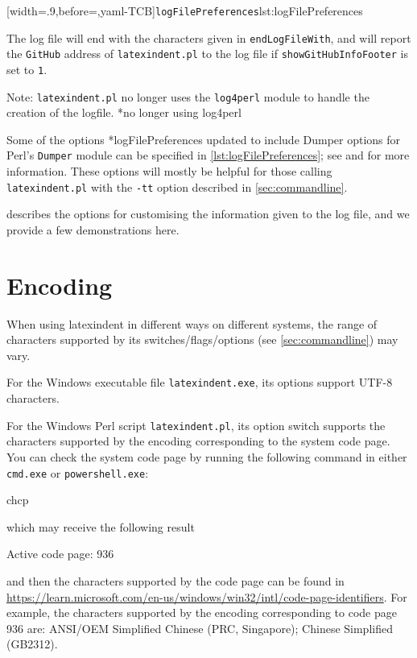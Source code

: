  [width=.9\linewidth,before=\centering,yaml-TCB]{\texttt{logFilePreferences}}{lst:logFilePreferences}

  The log file will end with the characters given in \texttt{endLogFileWith}, and will
  report the \texttt{GitHub} address of \texttt{latexindent.pl} to the log file if
  \texttt{showGitHubInfoFooter} is set to \texttt{1}.

  Note: \texttt{latexindent.pl} no longer uses the \texttt{log4perl} module to handle the
  creation of the logfile. *{no longer using log4perl}%

  Some of the options *{logFilePreferences updated to include Dumper
  options} for Perl's \texttt{Dumper} module can be specified in
  \cref{lst:logFilePreferences}; see \cite{dumper} and \cite{dumperdemo} for more
  information. These options will mostly be helpful for those calling
  \texttt{latexindent.pl} with the \texttt{-tt} option described in
  \cref{sec:commandline}.%

   describes the options for customising the information given
  to the log file, and we provide a few demonstrations here.

 \section{Encoding}\label{app:encoding}

  When using latexindent in different ways on different systems, the range of characters
  supported by its switches/flags/options (see \vref{sec:commandline}) may vary.

  For the Windows executable file \texttt{latexindent.exe}, its options support UTF-8
  characters.

  For the Windows Perl script \texttt{latexindent.pl}, its option switch supports the
  characters supported by the encoding corresponding to the system code page. You can
  check the system code page by running the following command in either \texttt{cmd.exe}
  or \texttt{powershell.exe}:
  \begin{dosprompt}
  chcp
  \end{dosprompt}
  which may receive the following result
  \begin{dosprompt}
  Active code page: 936
  \end{dosprompt}
  and then the characters supported by the code page can be found in \href{Microsoft's
  code page identifier
  table}{https://learn.microsoft.com/en-us/windows/win32/intl/code-page-identifiers}. For
  example, the characters supported by the encoding corresponding to code page 936 are:
  ANSI/OEM Simplified Chinese (PRC, Singapore); Chinese Simplified (GB2312).

